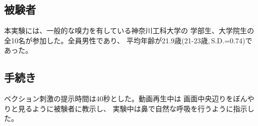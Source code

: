 \documentclass[uplatex]{jsarticle}   %
\begin{document}
\subsection{被験者}
本実験には、一般的な嗅力を有している神奈川工科大学の
学部生、大学院生の全10名が参加した。全員男性であり、
平均年齢が21.9歳(21-23歳,\,S.D.=0.74)であった。

\subsection{手続き}
ベクション刺激の提示時間は40秒とした。動画再生中は
画面中央辺りをぼんやりと見るように被験者に教示し、
実験中は鼻で自然な呼吸を行うように指示した。






\end{document}

